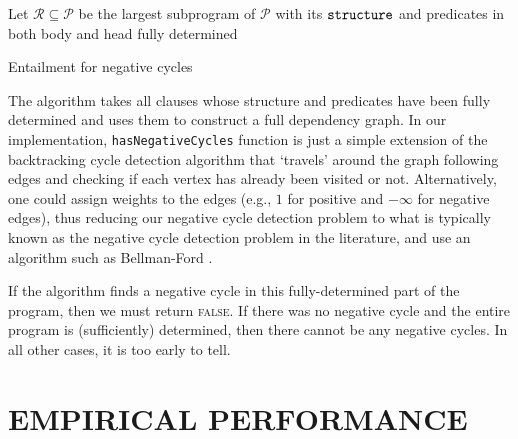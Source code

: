 \documentclass[letterpaper]{article}
\theoremstyle{definition}
\newcommand{\variable}[1]{\texttt{\textup{#1}}}
\begin{document}
\begin{algorithm}
  Let $\mathscr{R} \subseteq \mathscr{P}$ be the largest subprogram of
  $\mathscr{P}$ with its $\variable{structure}$ and predicates in both body
  and head fully determined\footnotemark\;
  \;
  \caption{Entailment for negative cycles}
  \label{alg:negative_cycles}
\end{algorithm}

The algorithm takes all clauses whose structure and predicates have been fully
determined and uses them to construct a full dependency graph. In our
implementation, \texttt{hasNegativeCycles} function is just a simple extension
of the backtracking cycle detection algorithm that `travels' around the graph
following edges and checking if each vertex has already been visited or not.
Alternatively, one could assign weights to the edges (e.g., $1$ for positive
and $-\infty$ for negative edges), thus reducing our negative cycle detection
problem to what is typically known as the negative cycle detection problem in
the literature, and use an algorithm such as Bellman-Ford
\citep{shimbel1954structure}.

If the algorithm finds a negative cycle in this fully-determined part of the
program, then we must return \textsc{false}. If there was no negative cycle and
the entire program is (sufficiently) determined, then there cannot be any
negative cycles. In all other cases, it is too early to tell.


\section{EMPIRICAL PERFORMANCE} \label{sec:experiments}
\end{document}
